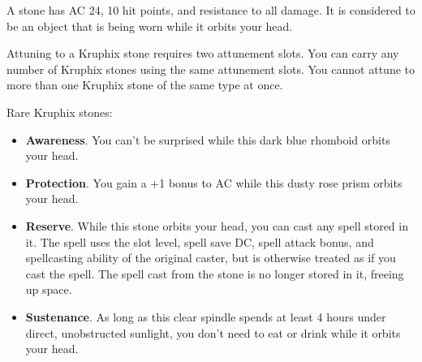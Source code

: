         A stone has AC 24, 10 hit points, and resistance to all damage.
        It is considered to be an object that is being worn while it orbits your head.

        Attuning to a Kruphix stone requires two attunement slots.
        You can carry any number of Kruphix stones using the same attunement slots.
        You cannot attune to more than one Kruphix stone of the same type at once.

        Rare Kruphix stones:
        \begin{itemize}
            \item \textbf{Awareness}.
            You can't be surprised while this dark blue rhomboid orbits your head.
            \item \textbf{Protection}.
            You gain a +1 bonus to AC while this dusty rose prism orbits your head.
            \item \textbf{Reserve}.
            While this stone orbits your head, you can cast any spell stored in it.
            The spell uses the slot level, spell save DC, spell attack bonus, and spellcasting ability of the original caster, but is otherwise treated as if you cast the spell.
            The spell cast from the stone is no longer stored in it, freeing up space.
            \item \textbf{Sustenance}.
            As long as this clear spindle spends at least 4 hours under direct, unobstructed sunlight, you don't need to eat or drink while it orbits your head.
        \end{itemize}

